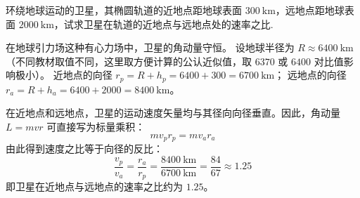 \begin{exercise}\label{ex:4.11}
环绕地球运动的卫星，其椭圆轨道的近地点距地球表面 $300 \ \mathrm{km}$，远地点距地球表面 $2000 \ \mathrm{km}$，试求卫星在轨道的近地点与远地点处的速率之比.
\end{exercise}
\begin{solution}
在地球引力场这种有心力场中，卫星的角动量守恒。
设地球半径为 $R \approx 6400 \ \mathrm{km}$（不同教材取值不同，这里取方便计算的公认近似值，取 $6370$ 或 $6400$ 对比值影响极小）。
近地点的向径 $r_p = R + h_p = 6400 + 300 = 6700 \ \mathrm{km}$；
远地点的向径 $r_a = R + h_a = 6400 + 2000 = 8400 \ \mathrm{km}$。

在近地点和远地点，卫星的运动速度矢量均与其径向向径垂直。因此，角动量 $L = mvr$ 可直接写为标量乘积：
$$ m v_p r_p = m v_a r_a $$
由此得到速度之比等于向径的反比：
$$ \frac{v_p}{v_a} = \frac{r_a}{r_p} = \frac{8400 \ \mathrm{km}}{6700 \ \mathrm{km}} = \frac{84}{67} \approx 1.25 $$
即卫星在近地点与远地点的速率之比约为 $1.25$。
\end{solution}

